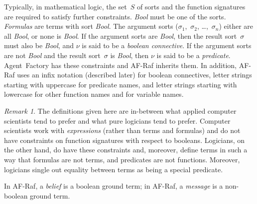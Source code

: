 \documentclass[preprint]{sigplanconf} %
\theoremstyle{remark}
\newtheorem{remark}{Remark}
\begin{document}
Typically, in mathematical logic, the set~$S$ of sorts and the function
signatures are required to satisfy further constraints. \textit{Bool} must
be one of the sorts. \emph{Formulas} are terms with sort \textit{Bool}.
The argument sorts ($\sigma_1$,~$\sigma_2$, \dots,~$\sigma_n$) either are
all \textit{Bool}, or none is \textit{Bool}.  If the argument sorts are
\textit{Bool}, then the result sort~$\sigma$ must also be \textit{Bool},
and $\nu$ is said to be a \emph{boolean connective}.  If the argument sorts
are not \textit{Bool} and the result sort~$\sigma$ is \textit{Bool}, then
$\nu$ is said to be a \emph{predicate}.  Agent~Factory has these
constraints and AF-Raf inherits them. In addition, AF-Raf uses an infix
notation (described later) for boolean connectives, letter strings starting
with uppercase for predicate names, and letter strings starting with
lowercase for other function names and for variable names.

\begin{remark}
The definitions given here are in-between what applied computer scientists
tend to prefer and what pure logicians tend to prefer.  Computer scientists
work with \emph{expressions} (rather than terms and formulas) and do not
have constraints on function signatures with respect to booleans.
Logicians, on the other hand, do have these constraints and, moreover,
define terms in such a way that formulas are not terms, and predicates are
not functions. Moreover, logicians single out equality between terms as
being a special predicate.
\end{remark}

In AF-Raf, a \emph{belief} is a boolean ground term; in AF-Raf, a
\emph{message} is a non-boolean ground term.
\end{document}
